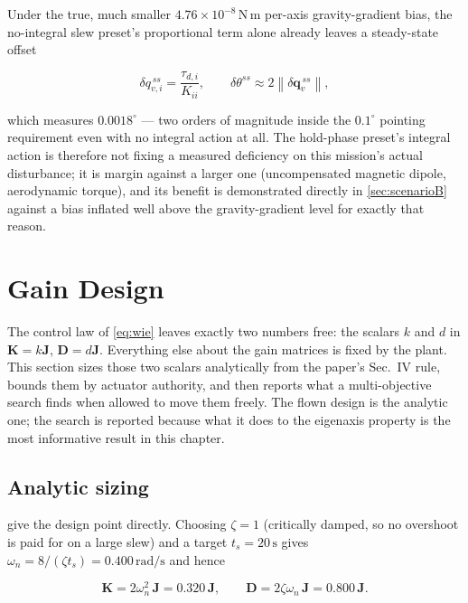 \documentclass[conference,10pt,a4paper]{IEEEtran}
\newenvironment{eqbox}{\ignorespaces}{\ignorespacesafterend}
\newcommand{\vect}[1]{\bm{#1}}
\newcommand{\mat}[1]{\bm{#1}}
\newcommand{\unit}[1]{\ensuremath{\,\mathrm{#1}}}
\begin{document}
Under the true, much smaller $4.76\times10^{-8}\unit{N\,m}$ per-axis
gravity-gradient bias, the no-integral slew preset's proportional term alone
already leaves a steady-state offset

\begin{equation}
\delta q_{v,i}^{\,ss} = \frac{\tau_{d,i}}{K_{ii}},
\qquad
\delta\theta^{ss} \approx 2\left\|\delta\vect{q}_v^{\,ss}\right\| ,
\label{eq:sserror}
\end{equation}

which measures $0.0018^\circ$ --- two orders of magnitude inside the
$0.1^\circ$ pointing requirement even with no integral action at all.
The hold-phase preset's integral action is therefore not fixing a measured
deficiency on this mission's actual disturbance; it is margin against a larger
one (uncompensated magnetic dipole, aerodynamic torque), and its benefit is
demonstrated directly in \cref{sec:scenarioB} against a bias inflated well
above the gravity-gradient level for exactly that reason.

\section{Gain Design}
\label{sec:gains}

The control law of \cref{eq:wie} leaves exactly two numbers free: the scalars
$k$ and $d$ in $\mat{K}=k\mat{J}$, $\mat{D}=d\mat{J}$. Everything else about
the gain matrices is fixed by the plant. This section sizes those two scalars
analytically from the paper's Sec.~IV rule, bounds them by actuator authority,
and then reports what a multi-objective search finds when allowed to move them
freely. The flown design is the analytic one; the search is reported because
what it does to the eigenaxis property is the most informative result in this
chapter.

\subsection{Analytic sizing}
\label{sec:analytic}

 give the design point directly. Choosing $\zeta=1$
(critically damped, so no overshoot is paid for on a large slew) and a target
$t_s=20\unit{s}$ gives $\omega_n = 8/(\zeta t_s) = 0.400\unit{rad/s}$ and hence

\begin{eqbox}
\begin{equation}
\mat{K} = 2\omega_n^2\,\mat{J} = 0.320\,\mat{J},
\qquad
\mat{D} = 2\zeta\omega_n\,\mat{J} = 0.800\,\mat{J} .
\label{eq:gainmap}
\end{equation}
\end{eqbox}
\end{document}
